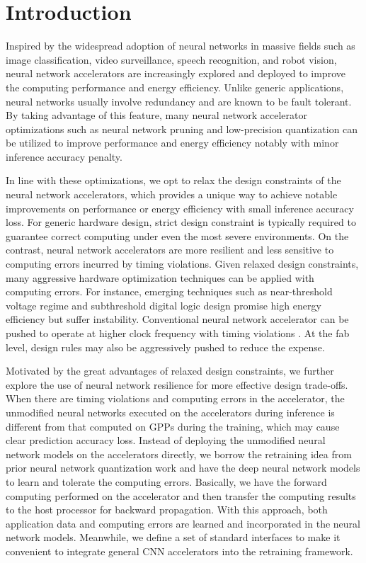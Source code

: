 \section{Introduction} \label{sec:intro}
Inspired by the widespread adoption of neural networks in massive fields such as image classification, 
video surveillance, speech recognition, and robot vision, neural network accelerators 
\cite{Zhang2015_9,Qiu2016_10,deepburing_12,DiCecco_4,Zeng2018_18} 
are increasingly explored and deployed to improve the computing performance and energy efficiency.
Unlike generic applications, neural networks usually involve redundancy and are known to be 
fault tolerant\cite{Reagen2016}. By taking advantage of this feature, many neural network accelerator optimizations 
such as neural network pruning and low-precision quantization can be utilized to improve 
performance and energy efficiency notably with minor inference accuracy penalty\cite{Han2016DeepCC}. 

In line with these optimizations, we opt to relax the design constraints of 
the neural network accelerators, which provides a unique way to achieve notable 
improvements on performance or energy efficiency with small inference accuracy loss. 
For generic hardware design, strict design constraint is typically required to 
guarantee correct computing under even the most severe environments. On the contrast, 
neural network accelerators are more resilient and less sensitive to computing 
errors incurred by timing violations. Given relaxed design constraints, many 
aggressive hardware optimization techniques can be applied with computing errors. 
For instance, emerging techniques such as  near-threshold voltage regime\cite{RG2010NT} 
and subthreshold digital logic design\cite{BH2005,B2006} promise high energy efficiency 
but suffer instability\cite{Pu2010NT}. Conventional neural network accelerator 
can be pushed to operate at higher clock frequency with timing violations
\cite{overclock_3,Paceline_15}. At the fab level, design rules may also 
be aggressively pushed to reduce the expense. 

Motivated by the great advantages of relaxed design constraints,
we further explore the use of neural network resilience for more 
effective design trade-offs. When there are timing violations
and computing errors in the accelerator, the unmodified neural networks 
executed on the accelerators during inference is different 
from that computed on GPPs during the training, which may cause clear 
prediction accuracy loss. Instead of deploying the unmodified neural 
network models on the accelerators directly, we borrow the retraining 
idea from prior neural network quantization work \cite{Hwang2014_17,Matthieu2014_8} 
and have the deep neural network models to learn and tolerate the computing errors.  
Basically, we have the forward computing performed on the accelerator and 
then transfer the computing results to the host processor for 
backward propagation. With this approach, both application data and computing 
errors are learned and incorporated in the neural network models.  
Meanwhile, we define a set of standard interfaces to make it convenient 
to integrate general CNN accelerators into the retraining framework. 

